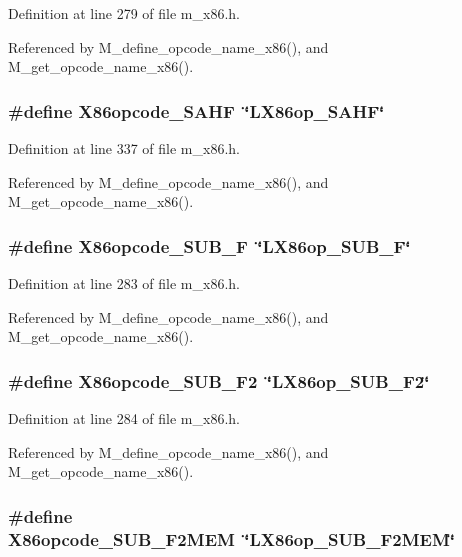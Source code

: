 Definition at line 279 of file m\_\-x86.h.

Referenced by M\_\-define\_\-opcode\_\-name\_\-x86(), and M\_\-get\_\-opcode\_\-name\_\-x86().
\subsubsection{\setlength{\rightskip}{0pt plus 5cm}\#define X86opcode\_\-SAHF~\char`\"{}LX86op\_\-SAHF\char`\"{}}\label{m__x86_8h_5d176889b55298b98d3b21bfcd57611f}




Definition at line 337 of file m\_\-x86.h.

Referenced by M\_\-define\_\-opcode\_\-name\_\-x86(), and M\_\-get\_\-opcode\_\-name\_\-x86().
\subsubsection{\setlength{\rightskip}{0pt plus 5cm}\#define X86opcode\_\-SUB\_\-F~\char`\"{}LX86op\_\-SUB\_\-F\char`\"{}}\label{m__x86_8h_9d6a5296d5334e1b3779a5d8f735b62a}




Definition at line 283 of file m\_\-x86.h.

Referenced by M\_\-define\_\-opcode\_\-name\_\-x86(), and M\_\-get\_\-opcode\_\-name\_\-x86().
\subsubsection{\setlength{\rightskip}{0pt plus 5cm}\#define X86opcode\_\-SUB\_\-F2~\char`\"{}LX86op\_\-SUB\_\-F2\char`\"{}}\label{m__x86_8h_f9eb9f373b9ba6450668ff263585b98e}




Definition at line 284 of file m\_\-x86.h.

Referenced by M\_\-define\_\-opcode\_\-name\_\-x86(), and M\_\-get\_\-opcode\_\-name\_\-x86().
\subsubsection{\setlength{\rightskip}{0pt plus 5cm}\#define X86opcode\_\-SUB\_\-F2MEM~\char`\"{}LX86op\_\-SUB\_\-F2MEM\char`\"{}}\label{m__x86_8h_3c56d127efaf841e5dcb53417d770768}




